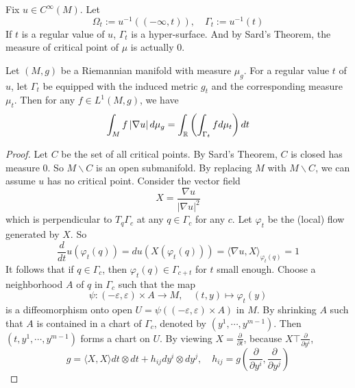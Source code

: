 \begin{enumerate}[label=\arabic{*}.]
	\noindent Fix $u \in C^\infty(M)$. Let
	\begin{equation*}
		\Omega_t:=u^{-1}((-\infty, t)), \quad \Gamma_t:=u^{-1}(t)
	\end{equation*}
	If $t$ is a regular value of $u$, $\Gamma_t$ is a hyper-surface. And by Sard's Theorem, the measure of critical point of $\mu$ is actually $0$.
	\begin{thm}
		Let $(M,g)$ be a Riemannian manifold with measure $\mu_g$. For a regular value $t$ of $u$, let $\Gamma_t$ be equipped with the induced metric $g_t$ and the corresponding measure $\mu_t$. Then for any $f \in L^1(M,g)$, we have
		\begin{equation*}
			\int_M f \left\lvert\nabla u\right\lvert d\mu_g = \int_{\mathbb{R}} \left(\int_{\Gamma_t} f d\mu_t\right) dt
		\end{equation*}
	\end{thm}
	\begin{proof}
		Let $C$ be the set of all critical points. By Sard's Theorem, $C$ is closed has measure $0$. So $M \backslash C$ is an open submanifold. By replacing $M$ with $M\backslash C$, we can assume $u$ has no critical point. Consider the vector field
		\begin{equation*}
			X=\frac{\nabla u}{|\nabla u|^2}
		\end{equation*}
		which is perpendicular to $T_q \Gamma_c$ at any $q \in \Gamma_c$ for any $c$. Let $\varphi_t$ be the (local) flow generated by $X$. So
		\begin{equation*}
			\frac{d}{d t} u\left(\varphi_t(q)\right)=d u\left(X\left(\varphi_t(q)\right)\right)=\langle\nabla u, X\rangle_{\varphi_t(q)}=1
		\end{equation*}
		It follows that if $q \in \Gamma_c$, then $\varphi_t(q) \in \Gamma_{c+t}$ for $t$ small enough. Choose a neighborhood $A$ of $q$ in $\Gamma_c$ such that the map
		\begin{equation*}
			\psi:(-\varepsilon, \varepsilon) \times A \rightarrow M, \quad(t, y) \mapsto \varphi_t(y)
		\end{equation*}
		is a diffeomorphism onto open $U=\psi((-\varepsilon, \varepsilon) \times A)$ in $M$. By shrinking $A$ such that $A$ is contained in a chart of $\Gamma_c$, denoted by $(y^1,\cdots,y^{m-1})$. Then $(t,y^1,\cdots,y^{m-1})$ forms a chart on $U$. By viewing $X = \frac{\partial}{\partial t}$, because $X \top \frac{\partial}{\partial y^i}$,
		\begin{equation*}
			g=\langle X, X\rangle d t \otimes d t+h_{i j} d y^i \otimes d y^j,\quad h_{i j}=g\left(\frac{\partial}{\partial y^i}, \frac{\partial}{\partial y^j}\right)

\end{equation*}
\end{proof}
\end{enumerate}
